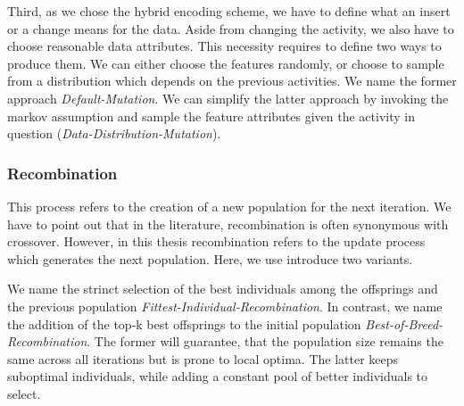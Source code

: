 \documentclass[./../../paper.tex]{subfiles}
\begin{document}
Third, as we chose the hybrid encoding scheme, we have to define what an insert or a change means for the data. Aside from changing the activity, we also have to choose reasonable data attributes. This necessity requires to define two ways to produce them. We can either choose the features randomly, or choose to sample from a distribution which depends on the previous activities. We name the former approach \emph{Default-Mutation}. We can simplify the latter approach by invoking the markov assumption and sample the feature attributes given the activity in question (\emph{Data-Distribution-Mutation}).

\subsubsection{Recombination}
This process refers to the creation of a new population for the next iteration. We have to point out that in the literature, recombination is often synonymous with crossover. However, in this thesis recombination refers to the update process which generates the next population. Here, we use introduce two variants.

We name the strinct selection of the best individuals among the offsprings and the previous population \emph{Fittest-Individual-Recombination}. In contrast, we name the addition of the top-k best offsprings to the initial population \emph{Best-of-Breed-Recombination}. The former will guarantee, that the population size remains the same across all iterations but is prone to local optima. The latter keeps suboptimal individuals, while adding a constant pool of better individuals to select.
\end{document}
